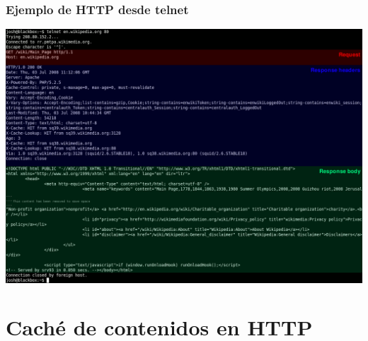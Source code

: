 \documentclass[hyperref={pdfpagelabels=true},ucs]{beamer}
\begin{document}
\begin{frame}
\frametitle{Ejemplo de HTTP desde telnet}

\begin{center}
\includegraphics[width=\textwidth]{figs/http_request_telnet_ubuntu}  
\end{center}


\end{frame}



\section{Caché de contenidos en HTTP}
\end{document}
